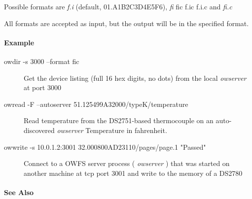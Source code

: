 Possible formats are \textit{f.i} (default, 01.A1B2C3D4E5F6),
\textit{fi} fic f.ic f.i.c and \textit{fi.c} 

All formats are accepted as input, but the output
will be in the specified format. 
\paragraph*{Example}
\begin{description}
\item [owdir -s 3000 --format fic ] Get the
device listing (full 16 hex digits, no dots) from the local \textit{owserver} at
port 3000 
\item [owread -F --autoserver 51.125499A32000/typeK/temperature ] Read temperature
from the DS2751-based thermocouple on an auto-discovered \textit{owserver} Temperature
in fahrenheit. 
\item [owwrite -s 10.0.1.2:3001 32.000800AD23110/pages/page.1 "Passed"
] Connect to a OWFS server process ( \textit{owserver} ) that was started on another
machine at tcp port 3001 and write to the memory of a DS2780 
\end{description}

\paragraph*{See Also}

